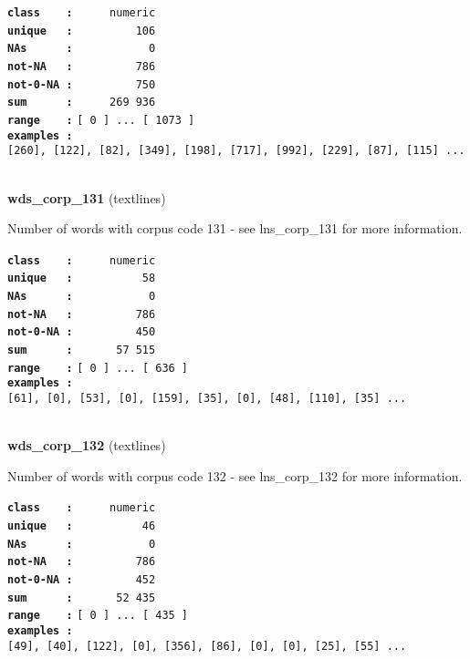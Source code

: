 \documentclass[]{article}
\begin{document}
\textbf{\texttt{class\ \ \ \ :}} \texttt{~~~~~numeric}\\
\textbf{\texttt{unique\ \ \ :}} \texttt{~~~~~~~~~106}\\
\textbf{\texttt{NAs\ \ \ \ \ \ :}} \texttt{~~~~~~~~~~~0}\\
\textbf{\texttt{not-NA\ \ \ :}} \texttt{~~~~~~~~~786}\\
\textbf{\texttt{not-0-NA\ :}} \texttt{~~~~~~~~~750}\\
\textbf{\texttt{sum\ \ \ \ \ \ :}} \texttt{~~~~~269~936}\\
\textbf{\texttt{range\ \ \ \ :}}
\texttt{{[}\ 0\ {]}\ ...\ {[}\ 1073\ {]}}\\
\textbf{\texttt{examples\ :}}
\texttt{{[}260{]},\ {[}122{]},\ {[}82{]},\ {[}349{]},\ {[}198{]},\ {[}717{]},\ {[}992{]},\ {[}229{]},\ {[}87{]},\ {[}115{]}\ ...}\\

~

\textbf{wds\_corp\_131} (textlines)

Number of words with corpus code 131 - see lns\_corp\_131 for more
information.

\textbf{\texttt{class\ \ \ \ :}} \texttt{~~~~~numeric}\\
\textbf{\texttt{unique\ \ \ :}} \texttt{~~~~~~~~~~58}\\
\textbf{\texttt{NAs\ \ \ \ \ \ :}} \texttt{~~~~~~~~~~~0}\\
\textbf{\texttt{not-NA\ \ \ :}} \texttt{~~~~~~~~~786}\\
\textbf{\texttt{not-0-NA\ :}} \texttt{~~~~~~~~~450}\\
\textbf{\texttt{sum\ \ \ \ \ \ :}} \texttt{~~~~~~57~515}\\
\textbf{\texttt{range\ \ \ \ :}}
\texttt{{[}\ 0\ {]}\ ...\ {[}\ 636\ {]}}\\
\textbf{\texttt{examples\ :}}
\texttt{{[}61{]},\ {[}0{]},\ {[}53{]},\ {[}0{]},\ {[}159{]},\ {[}35{]},\ {[}0{]},\ {[}48{]},\ {[}110{]},\ {[}35{]}\ ...}\\

~

\textbf{wds\_corp\_132} (textlines)

Number of words with corpus code 132 - see lns\_corp\_132 for more
information.

\textbf{\texttt{class\ \ \ \ :}} \texttt{~~~~~numeric}\\
\textbf{\texttt{unique\ \ \ :}} \texttt{~~~~~~~~~~46}\\
\textbf{\texttt{NAs\ \ \ \ \ \ :}} \texttt{~~~~~~~~~~~0}\\
\textbf{\texttt{not-NA\ \ \ :}} \texttt{~~~~~~~~~786}\\
\textbf{\texttt{not-0-NA\ :}} \texttt{~~~~~~~~~452}\\
\textbf{\texttt{sum\ \ \ \ \ \ :}} \texttt{~~~~~~52~435}\\
\textbf{\texttt{range\ \ \ \ :}}
\texttt{{[}\ 0\ {]}\ ...\ {[}\ 435\ {]}}\\
\textbf{\texttt{examples\ :}}
\texttt{{[}49{]},\ {[}40{]},\ {[}122{]},\ {[}0{]},\ {[}356{]},\ {[}86{]},\ {[}0{]},\ {[}0{]},\ {[}25{]},\ {[}55{]}\ ...}\\
\end{document}
